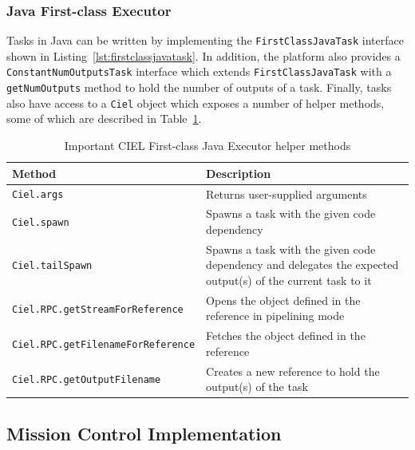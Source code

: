 \documentclass[a4paper,12pt,twoside,openright]{report}
\begin{document}
\subsubsection{Java First-class Executor}
Tasks in Java can be written by implementing the \texttt{FirstClassJavaTask}
interface shown in Listing~\ref{lst:firstclassjavatask}. In addition, the
platform also provides a \texttt{ConstantNumOutputsTask} interface which extends
\texttt{FirstClassJavaTask} with a \texttt{getNumOutputs} method to hold the
number of outputs of a task. Finally, tasks also have access to a \texttt{Ciel}
object which exposes a number of helper methods, some of which are described in
Table~\ref{chap:implem:sec:ciel:tab:task}.

\begin{table}
  \centering
  \begin{tabularx}{6in}{|X|X|} 
    \hline
	\textbf{Method} & \textbf{Description} \\ \hline \hline
    \texttt{Ciel.args} & Returns user-supplied arguments \\ \hline
    \texttt{Ciel.spawn} & Spawns a task with the given code dependency \\ \hline
    \texttt{Ciel.tailSpawn} & Spawns a task with the given code dependency and
    delegates the expected output(s) of the current task to it
    \\ \hline
    \texttt{Ciel.RPC.getStreamForReference} & Opens the object defined
    in the reference in pipelining mode \\ \hline
    \texttt{Ciel.RPC.getFilenameForReference} & Fetches the object defined in
    the reference \\ \hline
     \texttt{Ciel.RPC.getOutputFilename} & Creates a new reference to hold the
     output(s) of the task \\ \hline
 \end{tabularx} 
  \caption{Important CIEL First-class Java Executor helper methods}
  \label{chap:implem:sec:ciel:tab:task}
\end{table}

\subsection{Mission Control Implementation}
\end{document}
